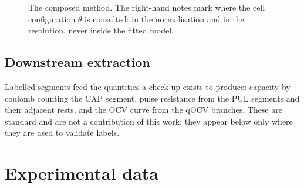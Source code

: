 \documentclass[preprint,3p,number]{elsarticle}
\begin{document}
\begin{figure}[t]
\centering
{}
\caption{The composed method. The right-hand notes mark where the cell
configuration $\theta$ is consulted: in the normalisation and in the
resolution, never inside the fitted model.}
\label{fig:algorithm}
\end{figure}

\subsection{Downstream extraction}

Labelled segments feed the quantities a check-up exists to produce: capacity by
coulomb counting the CAP segment, pulse resistance from the PUL segments and
their adjacent rests, and the OCV curve from the qOCV branches. These are
standard and are not a contribution of this work; they appear below only where
they are used to validate labels.


\section{Experimental data}
\label{sec:data}
\end{document}
